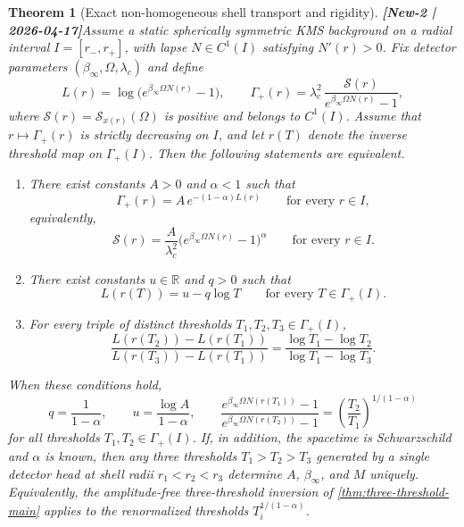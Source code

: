 \documentclass[11pt]{article}
\newtheorem{theorem}{Theorem}[section]
\theoremstyle{definition}
\newcommand{\RR}{\mathbb{R}}
\begin{document}
\begin{theorem}[Exact non-homogeneous shell transport and rigidity]\textbf{[New-2 | 2026-04-17]}\label{thm:tolman-power-main}
Assume a static spherically symmetric KMS background on a radial interval $I=[r_-,r_+]$, with lapse $N\in C^1(I)$ satisfying $N'(r)>0$. Fix detector parameters $(\beta_\infty,\Omega,\lambda_c)$ and define
\[
L(r)=\log\!\bigl(e^{\beta_\infty\Omega N(r)}-1\bigr),
\qquad
\Gamma_+(r)=\lambda_c^2\,
\frac{\mathcal S(r)}{e^{\beta_\infty\Omega N(r)}-1},
\]
where $\mathcal S(r)=\mathcal S_{x(r)}(\Omega)$ is positive and belongs to $C^1(I)$. Assume that $r\mapsto\Gamma_+(r)$ is strictly decreasing on $I$, and let $r(T)$ denote the inverse threshold map on $\Gamma_+(I)$. Then the following statements are equivalent.
\begin{enumerate}[label=\textup{(\roman*)},leftmargin=2.2em,itemsep=0.25em]
\item There exist constants $A>0$ and $\alpha<1$ such that
\begin{equation}\label{eq:tolman-power-main}
\Gamma_+(r)=A\,e^{-(1-\alpha)L(r)}
\qquad\text{for every }r\in I,
\end{equation}
equivalently,
\[
\mathcal S(r)=\frac{A}{\lambda_c^2}\bigl(e^{\beta_\infty\Omega N(r)}-1\bigr)^\alpha
\qquad\text{for every }r\in I.
\]
\item There exist constants $u\in\RR$ and $q>0$ such that
\begin{equation}\label{eq:tolman-affine-main}
L(r(T))=u-q\log T
\qquad\text{for every }T\in\Gamma_+(I).
\end{equation}
\item For every triple of distinct thresholds $T_1,T_2,T_3\in\Gamma_+(I)$,
\begin{equation}\label{eq:tolman-crossratio-main}
\frac{L(r(T_2))-L(r(T_1))}{L(r(T_3))-L(r(T_1))}
=
\frac{\log T_1-\log T_2}{\log T_1-\log T_3}.
\end{equation}
\end{enumerate}
When these conditions hold,
\begin{equation}\label{eq:tolman-ratio-main}
q=\frac{1}{1-\alpha},
\qquad
u=\frac{\log A}{1-\alpha},
\qquad
\frac{e^{\beta_\infty\Omega N(r(T_1))}-1}
     {e^{\beta_\infty\Omega N(r(T_2))}-1}
=
\left(\frac{T_2}{T_1}\right)^{1/(1-\alpha)}
\end{equation}
for all thresholds $T_1,T_2\in\Gamma_+(I)$. If, in addition, the spacetime is Schwarzschild and $\alpha$ is known, then any three thresholds $T_1>T_2>T_3$ generated by a single detector head at shell radii $r_1<r_2<r_3$ determine $A$, $\beta_\infty$, and $M$ uniquely. Equivalently, the amplitude-free three-threshold inversion of \cref{thm:three-threshold-main} applies to the renormalized thresholds $T_i^{1/(1-\alpha)}$.
\end{theorem}
\end{document}
